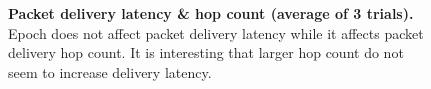 \documentclass[11pt]{article}
\begin{document}
\begin{figure}[h!]
\center
{}
\hfill
{}
\caption{{\bf Packet delivery latency \& hop count (average of 3 trials).}
Epoch does not affect packet delivery latency while it affects packet delivery hop count.  
It is interesting that larger hop count do not seem to increase delivery latency. 
}
\label{fig:delivery_latency_hopcount}
\end{figure}
\end{document}
